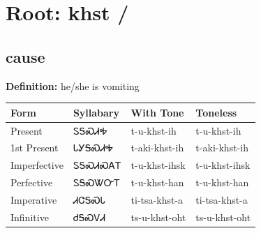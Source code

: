 \documentclass{article}%
\begin{document}
%
\normalsize%
\section*{Root: khst / }%
\subsection*{cause}%
\textbf{Definition: }%
he/she is vomiting%
\\[0.5em]%
\begin{tabular}{|l|l|l|l|}%
\hline%
\textbf{Form}&\textbf{Syllabary}&\textbf{With Tone}&\textbf{Toneless}\\%
\hline%
Present&ᏚᎦᏍᏗᎭ&t{-}u{-}khst{-}ih&t{-}u{-}khst{-}ih\\%
1st Present&ᏓᎩᎦᏍᏗᎭ&t{-}aki{-}khst{-}ih&t{-}aki{-}khst{-}ih\\%
Imperfective&ᏚᎦᏍᏗᏍᎪᎢ&t{-}u{-}khst{-}ihsk&t{-}u{-}khst{-}ihsk\\%
Perfective&ᏚᎦᏍᏔᏅᎢ&t{-}u{-}khst{-}han&t{-}u{-}khst{-}han\\%
Imperative&ᏗᏣᎦᏍᏓ&ti{-}tsa{-}khst{-}a&ti{-}tsa{-}khst{-}a\\%
Infinitive&ᏧᎦᏍᏙᏗ&ts{-}u{-}khst{-}oht&ts{-}u{-}khst{-}oht\\%
\hline%
\end{tabular}%
\\[1em]%
\end{document}
